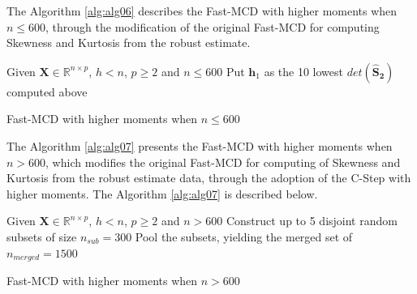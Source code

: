 \documentclass[review]{elsarticle}
\begin{document}
The Algorithm \ref{alg:alg06} describes the Fast-MCD with higher moments when $n \leq 600$, through the modification of the original Fast-MCD for computing Skewness and Kurtosis from the robust estimate.
    
\begin{algorithm}[H]\label{alg:alg06}
	\scriptsize
	\SetAlgoLined
	Given $\boldsymbol{X} \in \mathbb{R}^{n \times p}$, $h < n$, $p \geq 2$ and $n \leq 600$\;
	Put $\boldsymbol{h}_1$ as the 10 lowest $det(\boldsymbol{\hat{S}_2})$ computed above\;
	\caption{Fast-MCD with higher moments when $n \leq 600$}
\end{algorithm}

The Algorithm \ref{alg:alg07} presents the Fast-MCD with higher moments when $n > 600$, which modifies the original Fast-MCD for computing of Skewness and Kurtosis from the robust estimate data, through the adoption of the C-Step with higher moments. The Algorithm \ref{alg:alg07} is described below.

\begin{algorithm}[H]\label{alg:alg07}
	\scriptsize
	\SetAlgoLined
	Given $\boldsymbol{X} \in \mathbb{R}^{n \times p}$, $h < n$, $p \geq 2$ and $n > 600$\;
	Construct up to 5 disjoint random subsets of size $n_{sub} = 300$\;
	Pool the subsets, yielding the merged set of $n_{merged} = 1500$\;
	\caption{Fast-MCD with higher moments when $n > 600$}
\end{algorithm}
\end{document}
